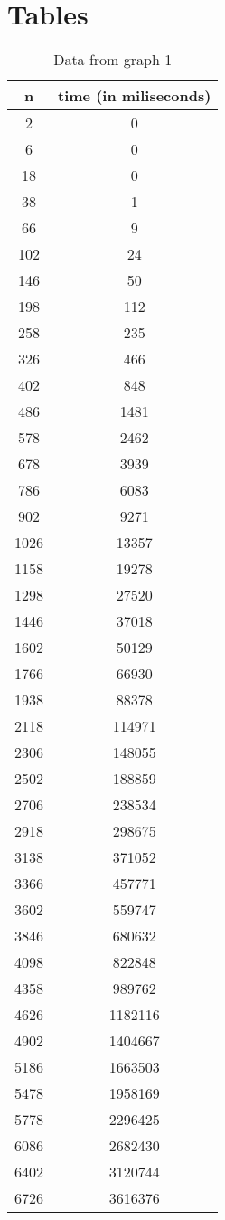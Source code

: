 \chapter{Tables}
\begin{table}[H]
\begin{tabular}{ |c|c| } 
 \hline
	n & time (in miliseconds) \\
	\hline
	2 & 0 \\
	\hline
	6 & 0 \\
	\hline
	18 & 0 \\
	\hline
	38 & 1 \\
	\hline
	66 & 9 \\
	\hline
	102 & 24 \\
	\hline
	146 & 50 \\
	\hline
	198 & 112 \\
	\hline
	258 & 235 \\
	\hline
	326 & 466 \\
	\hline
	402 & 848 \\
	\hline
	486 & 1481 \\
	\hline
	578 & 2462 \\
	\hline
	678 & 3939 \\
	\hline
	786 & 6083 \\
	\hline
	902 & 9271 \\
	\hline
	1026 & 13357 \\
	\hline
	1158 & 19278 \\
	\hline
	1298 & 27520 \\
	\hline
	1446 & 37018 \\
	\hline
	1602 & 50129 \\
	\hline
	1766 & 66930 \\
	\hline
	1938 & 88378 \\
	\hline
	2118 & 114971 \\
	\hline
	2306 & 148055 \\
	\hline
	2502 & 188859 \\
	\hline
	2706 & 238534 \\
	\hline
	2918 & 298675 \\
	\hline
	3138 & 371052 \\
	\hline
	3366 & 457771 \\
	\hline
	3602 & 559747 \\
	\hline
	3846 & 680632 \\
	\hline
	4098 & 822848 \\
	\hline
	4358 & 989762 \\
	\hline
	4626 & 1182116 \\
	\hline
	4902 & 1404667 \\
	\hline
	5186 & 1663503 \\
	\hline
	5478 & 1958169 \\
	\hline
	5778 & 2296425 \\
	\hline
	6086 & 2682430 \\
	\hline
	6402 & 3120744 \\
	\hline
	6726 & 3616376 \\
	\hline
\end{tabular}
\caption{Data from graph 1}
\end{table}

